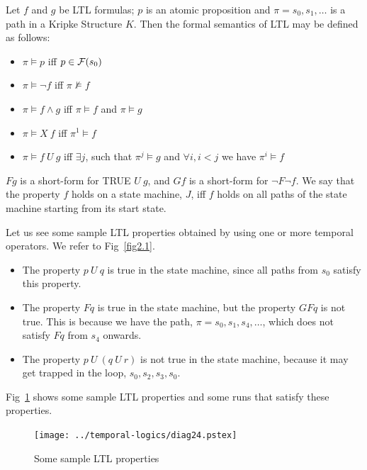 \noindent
Let $f$ and $g$ be LTL formulas; $p$ is an atomic proposition and
$\pi = s_0, s_1, \ldots$ is a path in a Kripke Structure $K$. Then the
formal semantics of LTL may be defined as follows:
\begin{itemize}

\item $\pi \models p$ iff $p \in {\cal F} (s_0)$

\item $\pi \models \neg f$ iff $\pi \not\models f$

\item $\pi \models f \land g$ iff $\pi \models f$
        and $\pi \models g$

\item $\pi \models X\ f$ iff $\pi^1 \models f$

\item $\pi \models f\ U\ g$ iff $\exists j$,
        such that $\pi^j \models g$ and $\forall i, i<j$ we
        have $\pi^i \models f$

\end{itemize} 
\noindent
$Fg$ is a short-form for TRUE $U\ g$, and $Gf$ is a short-form for
$\neg F \neg f$. We say that the property $f$ holds
on a state machine, $J$, iff $f$ holds on all paths of the state machine
starting from its start state. 

\noindent
Let us see some sample LTL properties obtained by using one or more temporal
operators. We refer to Fig~\ref{fig2.1}.
\begin{itemize}

\item The property $p\ U\ q$ is true in the state machine, since all paths
	from $s_0$ satisfy this property.

\item The property $Fq$ is true in the state machine, but the property
	$GFq$ is not true. This is because we have the path, 
	$\pi = s_0, s_1, s_4, \ldots$, which does not satisfy $Fq$ from
	$s_4$ onwards.

\item The property $p\ U\ (q\ U\ r)$ is not true in the state machine, 
	because it may get trapped in the loop, $s_0, s_2, s_3, s_0$.

\end{itemize}
\noindent
Fig~\ref{fig2.2} shows some sample LTL properties and some runs
that satisfy these properties.

\begin{figure}[htb]
\centering
\texttt{[image: ../temporal-logics/diag24.pstex]}
\center
\caption{Some sample LTL properties} \label{fig2.2}
\end{figure}

